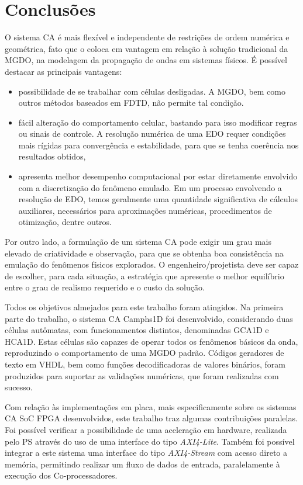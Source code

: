 \chapter[Conclusões]{Conclusões}

O sistema CA é mais flexível e independente de restrições de ordem numérica e geométrica, fato que o coloca em vantagem em relação à solução tradicional da MGDO, na modelagem da propagação de ondas em sistemas físicos. É possível destacar as principais vantagens: 

\begin{itemize}
    \item possibilidade de se trabalhar com células desligadas. A MGDO, bem como outros métodos baseados em FDTD, não permite tal condição.
	\item fácil alteração do comportamento celular, bastando para isso modificar regras ou sinais de controle. A resolução numérica de uma EDO requer condições mais rígidas para convergência e estabilidade, para que se tenha coerência nos resultados obtidos,
	\item apresenta melhor desempenho computacional por estar diretamente envolvido com a discretização do fenômeno emulado. Em um processo envolvendo a resolução de EDO, temos geralmente uma quantidade significativa de cálculos auxiliares, necessários para aproximações numéricas, procedimentos de otimização, dentre outros. 
\end{itemize}

Por outro lado, a formulação de um sistema CA pode exigir um grau mais elevado de criatividade e observação, para que se obtenha boa consistência na emulação do fenômenos físicos explorados. O engenheiro/projetista deve ser capaz de escolher, para cada situação, a estratégia que apresente o melhor equilíbrio entre o grau de realismo requerido e o custo da solução.

Todos os objetivos almejados para este trabalho foram atingidos. Na primeira parte do trabalho, o sistema CA Camphs1D foi desenvolvido, considerando duas células autômatas, com funcionamentos distintos, denominadas GCA1D e HCA1D. Estas células são capazes de operar todos os fenômenos básicos da onda, reproduzindo o comportamento de uma MGDO padrão. Códigos geradores de texto em VHDL, bem como funções decodificadoras de valores binários, foram produzidos para suportar as validações numéricas, que foram realizadas com sucesso.

Com relação às implementações em placa, mais especificamente sobre os sistemas CA SoC FPGA desenvolvidos, este trabalho traz algumas contribuições paralelas. Foi possível verificar a possibilidade de uma aceleração em hardware, realizada pelo PS através do uso de uma interface do tipo \textit{AXI4-Lite}. Também foi possível integrar a este sistema uma interface do tipo \textit{AXI4-Stream} com acesso direto a memória, permitindo realizar um fluxo de dados de entrada, paralelamente à execução dos Co-processadores.

